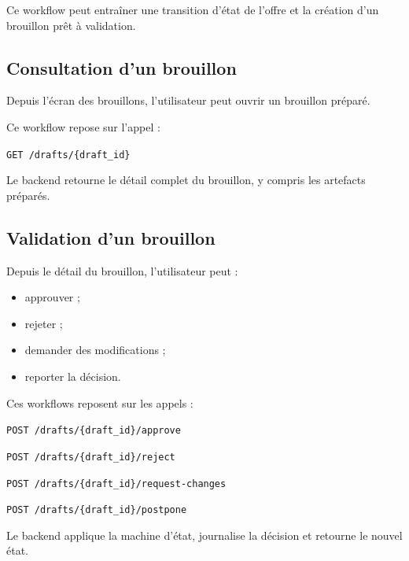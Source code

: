 \documentclass[11pt,a4paper]{article}
\begin{document}
Ce workflow peut entraîner une transition d’état de l’offre et la création d’un brouillon prêt à validation.

\subsection{Consultation d’un brouillon}

Depuis l’écran des brouillons, l’utilisateur peut ouvrir un brouillon préparé.

Ce workflow repose sur l’appel :

\begin{center}
\texttt{GET /drafts/\{draft\_id\}}
\end{center}

Le backend retourne le détail complet du brouillon, y compris les artefacts préparés.

\subsection{Validation d’un brouillon}

Depuis le détail du brouillon, l’utilisateur peut :

\begin{itemize}
    \item approuver ;
    \item rejeter ;
    \item demander des modifications ;
    \item reporter la décision.
\end{itemize}

Ces workflows reposent sur les appels :

\begin{center}
\texttt{POST /drafts/\{draft\_id\}/approve}
\end{center}

\begin{center}
\texttt{POST /drafts/\{draft\_id\}/reject}
\end{center}

\begin{center}
\texttt{POST /drafts/\{draft\_id\}/request-changes}
\end{center}

\begin{center}
\texttt{POST /drafts/\{draft\_id\}/postpone}
\end{center}

Le backend applique la machine d’état, journalise la décision et retourne le nouvel état.
\end{document}
